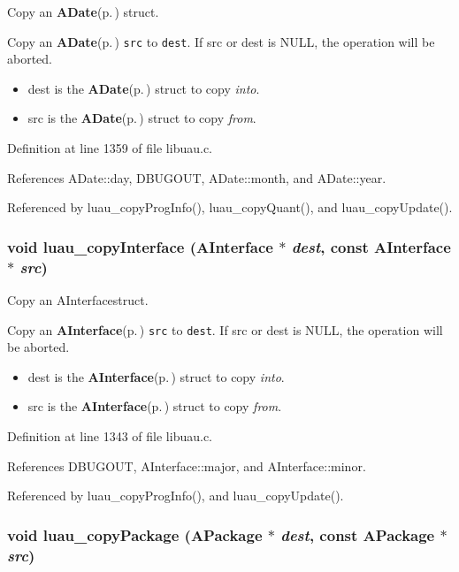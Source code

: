 Copy an {\bf ADate}{\rm (p.\,\pageref{structADate})} struct. 

Copy an {\bf ADate}{\rm (p.\,\pageref{structADate})} {\tt src} to {\tt dest}. If src or dest is NULL, the operation will be aborted.

\begin{itemize}
\item dest is the {\bf ADate}{\rm (p.\,\pageref{structADate})} struct to copy {\em into\/}. \item src is the {\bf ADate}{\rm (p.\,\pageref{structADate})} struct to copy {\em from\/}. \end{itemize}


Definition at line 1359 of file libuau.c.

References ADate::day, DBUGOUT, ADate::month, and ADate::year.

Referenced by luau\_\-copy\-Prog\-Info(), luau\_\-copy\-Quant(), and luau\_\-copy\-Update().
\subsubsection{\setlength{\rightskip}{0pt plus 5cm}void luau\_\-copy\-Interface ({\bf AInterface} $\ast$ {\em dest}, const {\bf AInterface} $\ast$ {\em src})}\label{libuau_8c_a46}


Copy an AInterfacestruct. 

Copy an {\bf AInterface}{\rm (p.\,\pageref{structAInterface})} {\tt src} to {\tt dest}. If src or dest is NULL, the operation will be aborted.

\begin{itemize}
\item dest is the {\bf AInterface}{\rm (p.\,\pageref{structAInterface})} struct to copy {\em into\/}. \item src is the {\bf AInterface}{\rm (p.\,\pageref{structAInterface})} struct to copy {\em from\/}. \end{itemize}


Definition at line 1343 of file libuau.c.

References DBUGOUT, AInterface::major, and AInterface::minor.

Referenced by luau\_\-copy\-Prog\-Info(), and luau\_\-copy\-Update().
\subsubsection{\setlength{\rightskip}{0pt plus 5cm}void luau\_\-copy\-Package ({\bf APackage} $\ast$ {\em dest}, const {\bf APackage} $\ast$ {\em src})}\label{libuau_8c_a44}


